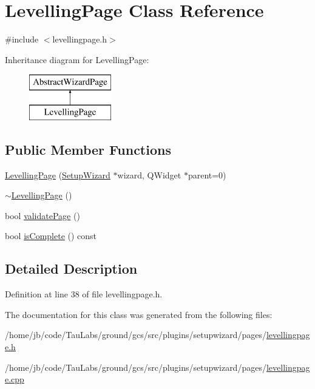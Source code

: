 \hypertarget{class_levelling_page}{\section{\-Levelling\-Page \-Class \-Reference}
\label{class_levelling_page}
}


{\ttfamily \#include $<$levellingpage.\-h$>$}

\-Inheritance diagram for \-Levelling\-Page\-:\begin{figure}[H]
\begin{center}
\leavevmode
\includegraphics[height=2.000000cm]{class_levelling_page}
\end{center}
\end{figure}
\subsection*{\-Public \-Member \-Functions}
\begin{DoxyCompactItemize}
\item 
\hyperlink{group___levelling_page_gaf6de9bbec0792b326f5611810012ef12}{\-Levelling\-Page} (\hyperlink{class_setup_wizard}{\-Setup\-Wizard} $\ast$wizard, \-Q\-Widget $\ast$parent=0)
\item 
\hyperlink{group___levelling_page_gab1c2df7313f33c1cca1e3e26138ed500}{$\sim$\-Levelling\-Page} ()
\item 
bool \hyperlink{group___levelling_page_gabfdb678df9700eb1f74286bfee0ace5c}{validate\-Page} ()
\item 
bool \hyperlink{group___levelling_page_gab7ca9c734d7d75df84c8dcd7a603de58}{is\-Complete} () const 
\end{DoxyCompactItemize}


\subsection{\-Detailed \-Description}


\-Definition at line 38 of file levellingpage.\-h.



\-The documentation for this class was generated from the following files\-:\begin{DoxyCompactItemize}
\item 
/home/jb/code/\-Tau\-Labs/ground/gcs/src/plugins/setupwizard/pages/\hyperlink{levellingpage_8h}{levellingpage.\-h}\item 
/home/jb/code/\-Tau\-Labs/ground/gcs/src/plugins/setupwizard/pages/\hyperlink{levellingpage_8cpp}{levellingpage.\-cpp}\end{DoxyCompactItemize}
